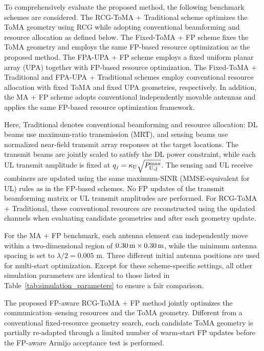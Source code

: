 \documentclass[letterpaper,journal]{IEEEtran}
\begin{document}
To comprehensively evaluate the proposed method, the following benchmark
schemes are considered. The RCG-ToMA + Traditional scheme optimizes the
ToMA geometry using RCG while adopting conventional beamforming and
resource allocation as defined below. The Fixed-ToMA + FP scheme fixes the ToMA geometry
and employs the same FP-based resource optimization as the proposed
method. The FPA-UPA + FP scheme employs a fixed uniform planar array
(UPA) together with FP-based resource optimization. The Fixed-ToMA +
Traditional and FPA-UPA + Traditional schemes employ conventional
resource allocation with fixed ToMA and fixed UPA geometries,
respectively. In addition, the MA + FP scheme adopts conventional
independently movable antennas and applies the same FP-based resource
optimization framework.

Here, Traditional denotes conventional beamforming and resource
allocation: DL beams use maximum-ratio transmission (MRT), and sensing
beams use normalized near-field transmit array responses at the target
locations. The transmit beams are jointly scaled to satisfy the DL
power constraint, while each UL transmit amplitude is fixed at
$q_j=\kappa_{\rm U}\sqrt{P_{{\rm U},j}^{\max}}$. The sensing and UL
receive combiners are updated using the same maximum-SINR
(MMSE-equivalent for UL) rules as in the FP-based schemes. No FP updates
of the transmit beamforming matrix or UL transmit amplitudes are
performed. For RCG-ToMA + Traditional, these conventional resources are
reconstructed using the updated channels when evaluating candidate
geometries and after each geometry update.

For the MA + FP benchmark, each antenna element can independently move
within a two-dimensional region of
$0.30\,{\rm m}\times0.30\,{\rm m}$, while the minimum antenna spacing is
set to $\lambda/2=0.005$ m. Three different initial antenna positions
are used for multi-start optimization. Except for these
scheme-specific settings, all other simulation parameters are identical
to those listed in Table~\ref{tab:simulation_parameters} to ensure a
fair comparison.

The proposed FP-aware RCG-ToMA + FP method jointly optimizes the
communication--sensing resources and the ToMA geometry. Different from
a conventional fixed-resource geometry search, each candidate ToMA
geometry is partially re-adapted through a limited number of warm-start
FP updates before the FP-aware Armijo acceptance test is performed.

\end{document}
